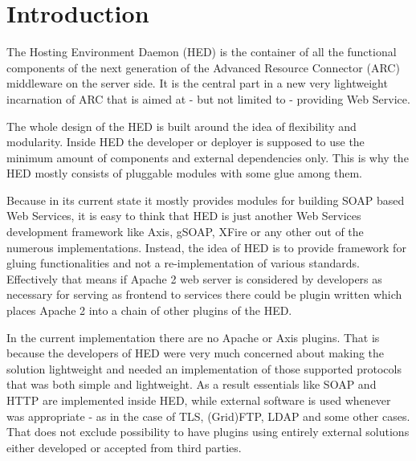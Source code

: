 \documentclass{book}
\begin{document}
\tableofcontents                          %
\newpage

\sloppy

\chapter{Introduction}

The Hosting Environment Daemon (HED) is the container of all the functional components of the next generation of the Advanced Resource Connector (ARC) middleware on the server side. It is the central part in a new very lightweight incarnation of ARC that is aimed at - but not limited to - providing Web Service.

The whole design of the HED is built around the idea of flexibility and modularity. Inside HED the developer or deployer is supposed to use the minimum amount of components and external dependencies only. This is why the HED mostly consists of pluggable modules with some glue among them.

Because in its current state it mostly provides modules for building SOAP based Web Services, it is easy to think that HED is just another Web Services development framework like Axis, gSOAP, XFire or any other out of the numerous implementations. Instead, the idea of HED is to provide framework for gluing functionalities and not a re-implementation of various standards. Effectively that means if Apache 2 web server is considered by developers as necessary for serving as frontend to services there could be plugin written which places Apache 2 into a chain of other plugins of the HED.

In the current implementation there are no Apache or Axis plugins. That is because the developers of HED were very much concerned about making the solution lightweight and needed an implementation of those supported protocols that was both simple and lightweight. As a result essentials like SOAP and HTTP are implemented inside HED, while external software is used whenever was appropriate - as in the case of TLS, (Grid)FTP, LDAP and some other cases. That does not exclude possibility to have plugins using entirely external solutions either developed or accepted from third parties.
\end{document}
